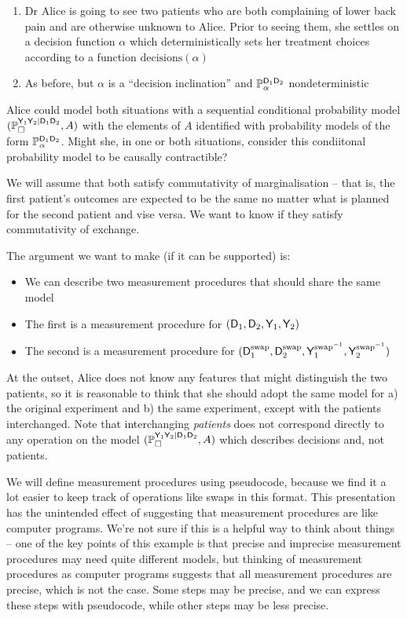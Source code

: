 \begin{enumerate}
    \item Dr Alice is going to see two patients who are both complaining of lower back pain and are otherwise unknown to Alice. Prior to seeing them, she settles on a decision function $\alpha$ which deterministically sets her treatment choices according to a function $\text{decisions}(\alpha)$
    \item As before, but $\alpha$ is a ``decision inclination'' and $\mathbb{P}_\alpha^{\mathsf{D}_1\mathsf{D}_2}$ nondeterministic
\end{enumerate}

Alice could model both situations with a sequential conditional probability model $(\mathbb{P}_\square^{\mathsf{Y}_1\mathsf{Y}_2|\mathsf{D}_1\mathsf{D}_2},A)$ with the elements of $A$ identified with probability models of the form $\mathbb{P}_\alpha^{\mathsf{D}_1\mathsf{D}_2}$. Might she, in one or both situations, consider this condiitonal probability model to be causally contractible?

We will assume that both satisfy commutativity of marginalisation -- that is, the first patient's outcomes are expected to be the same no matter what is planned for the second patient and vise versa. We want to know if they satisfy commutativity of exchange.

The argument we want to make (if it can be supported) is:
\begin{itemize}
    \item We can describe two measurement procedures that should share the same model
    \item The first is a measurement procedure for $(\mathsf{D}_1,\mathsf{D}_2,\mathsf{Y}_1,\mathsf{Y}_2)$
    \item The second is a measurement procedure for $(\mathsf{D}^{\text{swap}}_1,\mathsf{D}^{\text{swap}}_2,\mathsf{Y}^{\text{swap}^{-1}}_1,\mathsf{Y}^{\text{swap}^{-1}}_2)$
\end{itemize}

At the outset, Alice does not know any features that might distinguish the two patients, so it is reasonable to think that she should adopt the same model for a) the original experiment and b) the same experiment, except with the patients interchanged. Note that interchanging \emph{patients} does not correspond directly to any operation on the model $(\mathbb{P}_\square^{\mathsf{Y}_1\mathsf{Y}_2|\mathsf{D}_1\mathsf{D}_2},A)$ which describes decisions and, not patients.

We will define measurement procedures using pseudocode, because we find it a lot easier to keep track of operations like swaps in this format. This presentation has the unintended effect of suggesting that measurement procedures are like computer programs. We're not sure if this is a helpful way to think about things -- one of the key points of this example is that precise and imprecise measurement procedures may need quite different models, but thinking of measurement procedures as computer programs suggests that all measurement procedures are precise, which is not the case. Some steps may be precise, and we can express these steps with pseudocode, while other steps may be less precise. 

